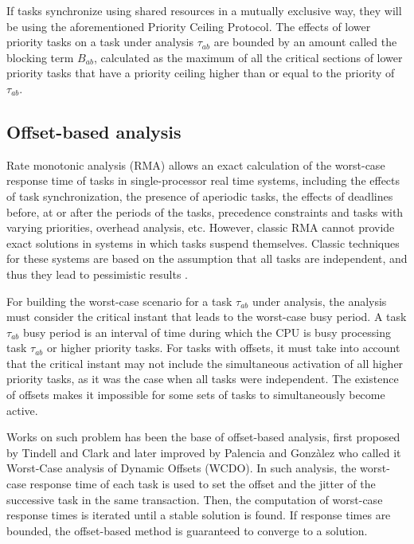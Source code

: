 \documentclass{article}
\begin{document}
If tasks synchronize using shared resources in a mutually exclusive way, they will be using the aforementioned Priority Ceiling Protocol. The effects of lower priority tasks on a task under analysis $\tau_{ab}$ are bounded by an amount called the blocking term $B_{ab}$, calculated as the maximum of all the critical sections of lower priority tasks that have a priority ceiling higher than or equal to the priority of $\tau_{ab}$.

\subsection{Offset-based analysis}

Rate monotonic analysis (RMA) \cite{rm-dm} allows an exact calculation of the worst-case response time of tasks in single-processor real time systems, including the effects of task synchronization, the presence of aperiodic tasks, the effects of deadlines before, at or after the periods of the tasks, precedence constraints and tasks with varying priorities, overhead analysis, etc. However, classic RMA \cite{practitioner-common-data} cannot provide exact solutions in systems in which tasks suspend themselves. Classic techniques for these systems are based on the assumption that all tasks are independent, and thus they lead to pessimistic results \cite{pessimistic-rma}.

For building the worst-case scenario for a task $\tau_{ab}$ under analysis, the analysis must consider the critical instant that leads to the worst-case busy period. A task $\tau_{ab}$ busy period is an interval of time during which the CPU is busy processing task $\tau_{ab}$ or higher priority tasks. For tasks with offsets, it must take into account that the critical instant may not include the simultaneous activation of all higher priority tasks, as it was the case when all tasks were independent. The existence of offsets makes it impossible for some sets of tasks to simultaneously become active.

Works on such problem has been the base of offset-based analysis, first proposed by Tindell and Clark \cite{tindell-offsets} and later improved by Palencia and Gonzàlez \cite{pessimistic-rma} who called it Worst-Case analysis of Dynamic Offsets (WCDO). In such analysis, the worst-case response time of each task is used to set the offset and the jitter of the successive task in the same transaction. Then, the computation of worst-case response times is iterated until a stable solution is found. If response times are bounded, the offset-based method is guaranteed to converge to a solution.
\end{document}

